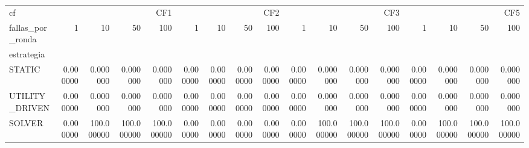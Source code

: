 \begin{tabular}{lrrrrrrrrrrrrrrrr}
\toprule
cf & \multicolumn{4}{r}{CF1} & \multicolumn{4}{r}{CF2} & \multicolumn{4}{r}{CF3} & \multicolumn{4}{r}{CF5} \\
fallas_por_ronda & 1 & 10 & 50 & 100 & 1 & 10 & 50 & 100 & 1 & 10 & 50 & 100 & 1 & 10 & 50 & 100 \\
estrategia &  &  &  &  &  &  &  &  &  &  &  &  &  &  &  &  \\
\midrule
STATIC & 0.000000 & 0.000000 & 0.000000 & 0.000000 & 0.000000 & 0.000000 & 0.000000 & 0.000000 & 0.000000 & 0.000000 & 0.000000 & 0.000000 & 0.000000 & 0.000000 & 0.000000 & 0.000000 \\
UTILITY_DRIVEN & 0.000000 & 0.000000 & 0.000000 & 0.000000 & 0.000000 & 0.000000 & 0.000000 & 0.000000 & 0.000000 & 0.000000 & 0.000000 & 0.000000 & 0.000000 & 0.000000 & 0.000000 & 0.000000 \\
SOLVER & 0.000000 & 100.000000 & 100.000000 & 100.000000 & 0.000000 & 0.000000 & 0.000000 & 0.000000 & 0.000000 & 100.000000 & 100.000000 & 100.000000 & 0.000000 & 100.000000 & 100.000000 & 100.000000 \\
\bottomrule
\end{tabular}
